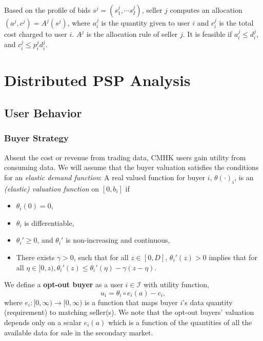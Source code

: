 \documentclass[12pt]{article}
\theoremstyle{definition}
\newcommand{\mcI}{\mathcal{I}}
\begin{document}
\begin{multicols}{2}
Based on the profile of bids $s^j = (s^j_1, \cdots s^j_I)$, seller $j$ computes
an allocation $(a^j, c^j) = A^j(s^j)$, where $a^j_i$ is the quantity given to
user $i$ and $c^j_i$ is the total cost charged to user $i$. $A^j$ is the
allocation rule of seller $j$. It is feasible if $a^j_i \le d_i^j$, and $c^j_i \le  p^j_i d_i^j$.

\section{Distributed PSP Analysis}
\subsection{User Behavior}

\subsubsection{Buyer Strategy}
Absent the cost or revenue from trading data, CMHK users gain utility from consuming
data. 
We will assume that the buyer valuation satisfies the conditions for an
\emph{elastic demand function}: 
A real valued function for buyer $i$, $\theta(\cdot)_i$, is an \emph{(elastic) valuation
function} on $[0, b_i]$ if 
\begin{itemize}
    \item $\theta_i(0) = 0$,
    \item $\theta_i$ is differentiable,
    \item ${\theta_i}' \ge 0$, and ${\theta_i}'$ is non-increasing and continuous,
     \item There exists $\gamma > 0$, such that for all $z \in [0,D]$,
${\theta_i}
'(z) > 0$ implies that for all $\eta \in [0, z), {\theta_i}'(z) \le {\theta_i}'(\eta)
- \gamma(z - \eta)$. 
\end{itemize}
We define a \textbf{opt-out buyer} as a user $i\in\mcI$ with utility
function,
\begin{equation}\label{opt-utility}
    u_i = \theta_i \circ e_i(a) - c_i,
\end{equation}
where $e_i : [0, \infty) \rightarrow [0,\infty)$ is %
a function that maps buyer $i$'s data quantity (requirement) to matching
seller(s). We note that the opt-out buyers' valuation depends only on a scalar $e_i(a)$ which is a function of the
quantities of all the available data for sale in the secondary market. 


\end{multicols}
\end{document}
